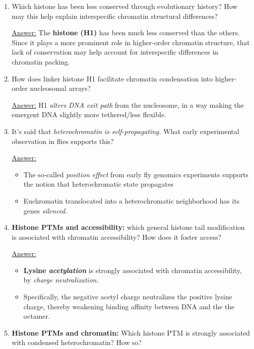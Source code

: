 \documentclass{article}
\newenvironment{QandA}{\begin{enumerate}[label=\bfseries Q\arabic*.]}
                       {\end{enumerate}}
\newenvironment{answered}{\par\normalfont\underline{Answer:}}{}
\begin{document}
\begin{QandA}
\begin{answered}
    \end{answered}
  \item{Which histone has been less conserved through evolutionary history? How may this help explain interspecific chromatin structural differences?}
    \begin{answered}
    The \textbf{ histone (H1)} has been much less conserved than the others. Since it plays a more prominent role in higher-order chromatin structure, that lack of conservation may help account for interspecific differences in chromatin packing.
    \end{answered}
  \item{How does linker histone H1 facilitate chromatin condensation into higher-order nucleosomal arrays?}
    \begin{answered}
    H1 \textit{alters DNA exit path} from the nucleosome, in a way making the emergent DNA slightly more tethered/less flexible.
    \end{answered}
  \item{It's said that \textit{heterochromatin is self-propagating.} What early experimental observation in flies supports this?}
    \begin{answered}
    \begin{itemize}
      \item{The so-called \textit{position effect} from early fly genomics experiments supports the notion that heterochromatic state propagates}
      \item{Euchromatin translocated into a heterochromatic neighborhood has its genes \textit{silenced}.}
    \end{itemize}
    \end{answered}
  \item{\textbf{Histone PTMs and accessibility:} which general histone tail modification is associated with chromatin accessibility? How does it foster access?}
    \begin{answered}
    \begin{itemize}
      \item{\textbf{Lysine \textit{acetylation}} is strongly associated with chromatin accessibility, by \textit{charge neutralization.}}
      \item{Specifically, the negative acetyl charge neutralizes the positive lysine charge, thereby weakening binding affinity between DNA and the the octamer.}
    \end{itemize}
    \end{answered}
  \item{\textbf{Histone PTMs and chromatin:} Which histone PTM is strongly associated with condensed heterochromatin? How so?}

\end{QandA}
\end{document}
